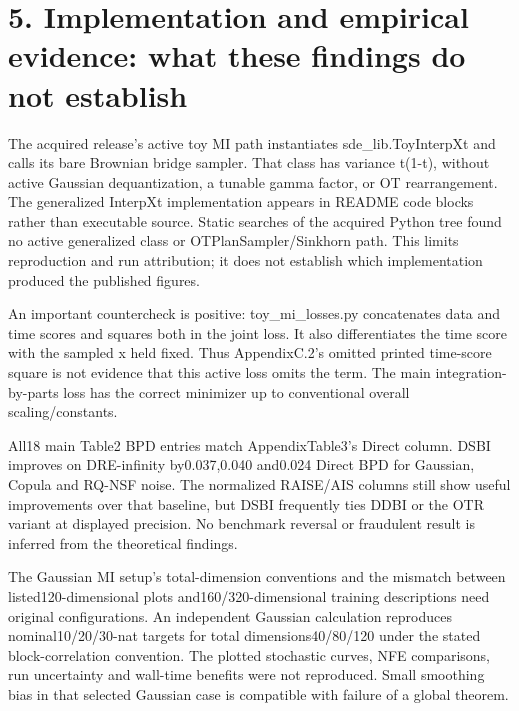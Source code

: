 \documentclass[10pt]{article}
\begin{document}
\section*{5. Implementation and empirical evidence: what these findings do not establish}
The acquired release’s active toy MI path instantiates sde\_lib.ToyInterpXt and calls its bare Brownian bridge sampler. That class has variance t(1-t), without active Gaussian dequantization, a tunable gamma factor, or OT rearrangement. The generalized InterpXt implementation appears in README code blocks rather than executable source. Static searches of the acquired Python tree found no active generalized class or OTPlanSampler/Sinkhorn path. This limits reproduction and run attribution; it does not establish which implementation produced the published figures.\par
An important countercheck is positive: toy\_mi\_losses.py concatenates data and time scores and squares both in the joint loss. It also differentiates the time score with the sampled x held fixed. Thus AppendixC.2’s omitted printed time-score square is not evidence that this active loss omits the term. The main integration-by-parts loss has the correct minimizer up to conventional overall scaling/constants.\par
All18 main Table2 BPD entries match AppendixTable3’s Direct column. DSBI improves on DRE-infinity by0.037,0.040 and0.024 Direct BPD for Gaussian, Copula and RQ-NSF noise. The normalized RAISE/AIS columns still show useful improvements over that baseline, but DSBI frequently ties DDBI or the OTR variant at displayed precision. No benchmark reversal or fraudulent result is inferred from the theoretical findings.\par
The Gaussian MI setup’s total-dimension conventions and the mismatch between listed120-dimensional plots and160/320-dimensional training descriptions need original configurations. An independent Gaussian calculation reproduces nominal10/20/30-nat targets for total dimensions40/80/120 under the stated block-correlation convention. The plotted stochastic curves, NFE comparisons, run uncertainty and wall-time benefits were not reproduced. Small smoothing bias in that selected Gaussian case is compatible with failure of a global theorem.\par
\end{document}

